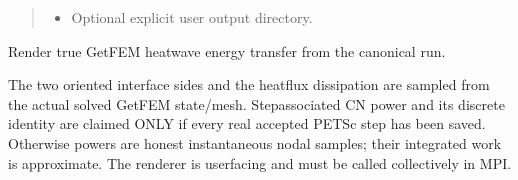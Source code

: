 \documentclass[letterpaper,10pt,english]{sphinxmanual}
\begin{document}
\begin{fulllineitems}
\begin{quote}
\begin{description}
\begin{itemize}
\item {} 
\sphinxAtStartPar
{} \textendash{} Optional explicit user output directory.

\end{itemize}

\end{description}\end{quote}

\end{fulllineitems}


\begin{fulllineitems}
\label{\detokenize{examples/heat_wave:examples.heat_wave.render_heat_wave_energy_ports}}
\pysigstartsignatures
\pysiglinewithargsret
{}
{\sphinxparamcomma {}\sphinxparamcomma {}\sphinxparamcomma {}}
{}
\pysigstopsignatures
\sphinxAtStartPar
Render true GetFEM heat\sphinxhyphen{}wave energy transfer from the canonical run.

\sphinxAtStartPar
The two oriented interface sides and the heat\sphinxhyphen{}flux dissipation are
sampled from the actual solved GetFEM state/mesh. Step\sphinxhyphen{}associated
CN power and its discrete identity are claimed ONLY if every real
accepted PETSc step has been saved. Otherwise powers are honest
instantaneous nodal samples; their integrated work is approximate.
The renderer is user\sphinxhyphen{}facing and must be called collectively in MPI.

\end{fulllineitems}

\end{document}
